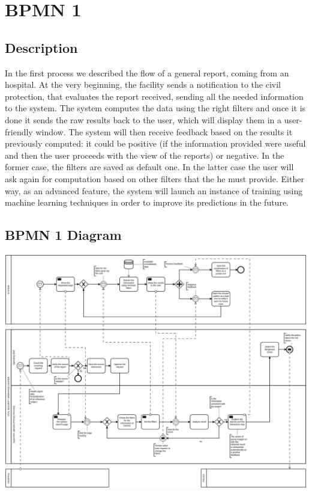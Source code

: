 \documentclass[../main.tex]{subfiles}
\begin{document}
    \chapter{BPMN 1}\label{ch:bpmn-1}
    \section{Description}\label{sec:description2}
    In the first process we described the flow of a general report, coming from an hospital. At the very beginning, the facility sends a notification to the civil protection, that evaluates the report received, sending all the needed information to the system. The system computes the data using the right filters and once it is done it sends the raw results back to the user, which will display them in a user-friendly window. The system will then receive feedback based on the results it previously computed: it could be positive (if the information provided were useful and then the user proceeds with the view of the reports) or negative. In the former case, the filters are saved as default one. In the latter case the user will ask again for computation based on other filters that the he must provide.
    Either way, as an advanced feature, the system will launch an instance of training using machine learning techniques in order to improve its predictions in the future.

    \section{BPMN 1 Diagram}\label{sec:bpmn-1-diagram}
    \includegraphics[scale = 0.40]{assets/bpmn1.png}
\end{document}
